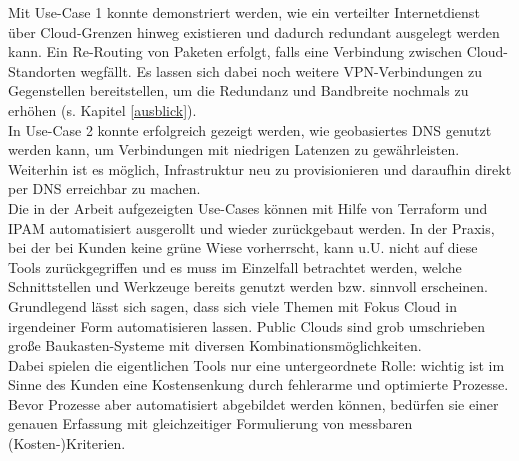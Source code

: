 Mit Use-Case 1 konnte demonstriert werden, wie ein verteilter Internetdienst über Cloud-Grenzen hinweg existieren und dadurch redundant ausgelegt werden kann. Ein Re-Routing von Paketen erfolgt, falls eine Verbindung zwischen Cloud-Standorten wegfällt. Es lassen sich dabei noch weitere VPN-Verbindungen zu Gegenstellen bereitstellen, um die Redundanz und Bandbreite nochmals zu erhöhen (s. Kapitel \ref{ausblick}).\\
In Use-Case 2 konnte erfolgreich gezeigt werden, wie geobasiertes DNS genutzt werden kann, um Verbindungen mit niedrigen Latenzen zu gewährleisten. Weiterhin ist es möglich, Infrastruktur neu zu provisionieren und daraufhin direkt per DNS erreichbar zu machen.\\ 
Die in der Arbeit aufgezeigten Use-Cases können mit Hilfe von Terraform und IPAM automatisiert ausgerollt und wieder zurückgebaut werden. In der Praxis, bei der bei Kunden keine \glqq grüne Wiese\grqq{} vorherrscht, kann u.U. nicht auf diese Tools zurückgegriffen und es muss im Einzelfall betrachtet werden, welche Schnittstellen und Werkzeuge bereits genutzt werden bzw. sinnvoll erscheinen. Grundlegend lässt sich sagen, dass sich viele Themen mit Fokus Cloud in irgendeiner Form automatisieren lassen. Public Clouds sind grob umschrieben große \glqq Baukasten-Systeme\grqq{} mit diversen Kombinationsmöglichkeiten.\\
Dabei spielen die eigentlichen Tools nur eine untergeordnete Rolle: wichtig ist im Sinne des Kunden eine Kostensenkung durch fehlerarme und optimierte Prozesse. Bevor Prozesse aber automatisiert abgebildet werden können, bedürfen sie einer genauen Erfassung mit gleichzeitiger Formulierung von messbaren (Kosten-)Kriterien.%

